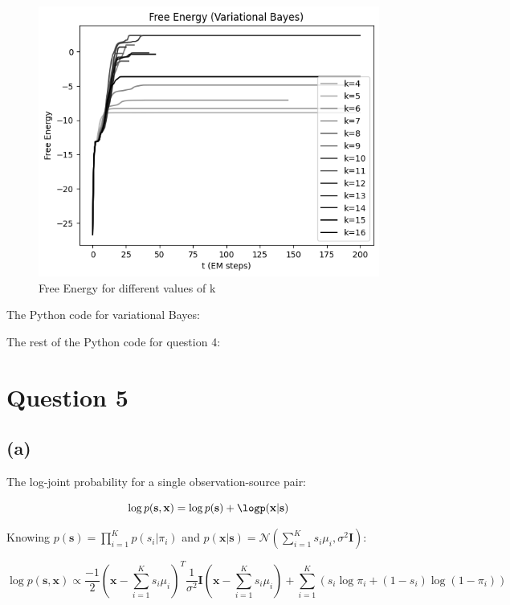 \documentclass[12pt]{article}
\begin{document}
\newpage
\begin{figure}[h]
\centering
\includegraphics[scale=0.8]{outputs/q4/b-free-energy}
\caption{Free Energy for different values of k}
\label{fig:}
\end{figure}

\newpage
The Python code for variational Bayes:


\newpage
The rest of the Python code for question 4:


\newpage
\section*{Question 5}

\subsection*{(a)}

The log-joint probability for a single observation-source pair:

\[\log p(\textbf{s}, \textbf{x}) = \log p(\textbf{s}) + \logp(\textbf{x}|\textbf{s})\]

Knowing $p(\textbf{s}) = \prod_{i=1}^{K}p(s_i| \pi_i)$ and $p(\textbf{x}|\textbf{s}) = \mathcal{N}(\sum_{i=1}^{K} s_i \mu_i, \sigma^2 \textbf{I})$:

\[\log p(\textbf{s}, \textbf{x})  \propto \frac{-1}{2}\left( \textbf{x} - \sum_{i=1}^{K}s_i \mu_i\right)^T \frac{1}{\sigma^2} \textbf{I} \left( \textbf{x} - \sum_{i=1}^{K} s_i \mu_i\right) + \sum_{i=1}^{K} \left(s_i \log\pi_i + (1-s_i)\log(1-\pi_i)\right)\]
\end{document}

